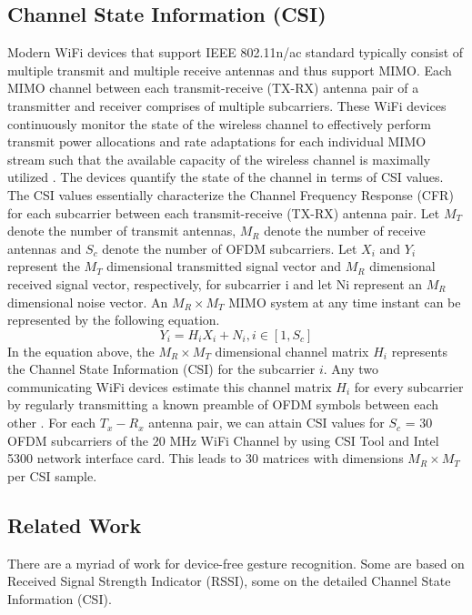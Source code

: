 \documentclass[conference]{IEEEtran}
\begin{document}
\subsection{Channel State Information (CSI)}
Modern WiFi devices that support IEEE 802.11n/ac standard typically consist of multiple transmit and multiple receive antennas and thus support MIMO. Each MIMO channel between each transmit-receive (TX-RX) antenna pair of a transmitter and receiver comprises of multiple subcarriers. These WiFi devices continuously monitor the state of the wireless channel to effectively perform transmit power allocations and rate adaptations for each individual MIMO stream such that the available capacity of the wireless channel is maximally utilized \cite{halperin2010802}. The devices quantify the state of the channel in terms of CSI values. The CSI values essentially characterize the Channel Frequency Response (CFR) for each subcarrier between each transmit-receive (TX-RX) antenna pair.
Let $M_T$ denote the number of transmit antennas, $M_R$ denote the number of receive antennas and $S_c$ denote the number of OFDM subcarriers. Let $X_i$ and $Y_i$ represent the $M_T$ dimensional transmitted signal vector and $M_R$ dimensional received signal vector, respectively, for subcarrier i and let Ni represent an $M_R$ dimensional noise vector. An $M_R \times M_T$ MIMO system at any time instant can be represented by the following equation.
\begin{equation}
	Y_i = H_iX_i + N_i, i \in [1, S_c]
\end{equation}
In the equation above, the $M_R \times M_T$ dimensional channel matrix $H_i$ represents the Channel State Information (CSI) for the subcarrier $i$. Any two communicating WiFi devices estimate this channel matrix $H_i$ for every subcarrier by regularly transmitting a known preamble of OFDM symbols between each other \cite{ali2015keystroke}. For each $T_x-R_x$ antenna pair, we can attain CSI values for $S_c$ = 30 OFDM subcarriers of the 20 MHz WiFi Channel by using CSI Tool and Intel 5300 network interface card. This leads to 30 matrices with dimensions $M_R \times M_T$ per CSI sample.

\subsection{Related Work}
There are a myriad of work for device-free gesture recognition. Some are based on Received Signal Strength Indicator (RSSI), some on the detailed Channel State Information (CSI).
\end{document}
